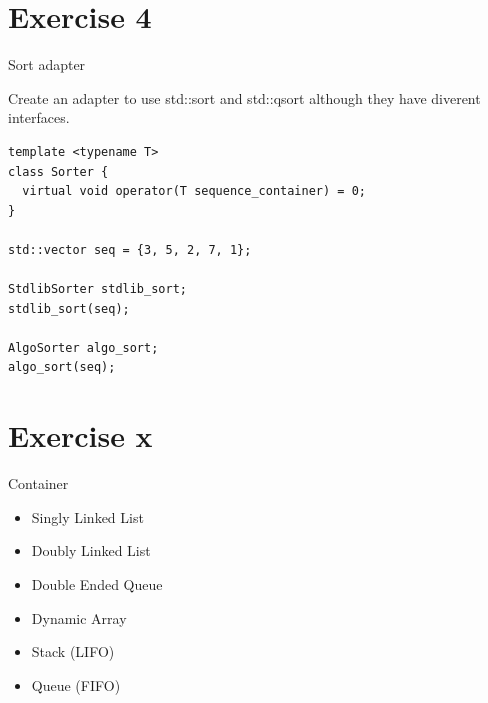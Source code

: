 \documentclass{beamer}
\begin{document}
\section{Exercise 4}
\begin{frame}[fragile]{Sort adapter}

Create an adapter to use std::sort and std::qsort although they have diverent
interfaces.

\begin{lstlisting}
template <typename T>
class Sorter {
  virtual void operator(T sequence_container) = 0;
}

std::vector seq = {3, 5, 2, 7, 1};

StdlibSorter stdlib_sort;
stdlib_sort(seq);

AlgoSorter algo_sort;
algo_sort(seq);
\end{lstlisting}

\end{frame}

\section{Exercise x}

\begin{frame}{Container}
\begin{itemize}
  \item Singly Linked List
  \item Doubly Linked List
  \item Double Ended Queue
  \item Dynamic Array
  \item Stack (LIFO)
  \item Queue (FIFO)
\end{itemize}
\end{frame}
\end{document}
